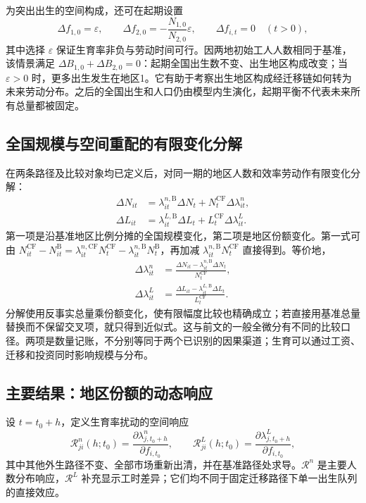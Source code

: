 \documentclass[UTF8,a4paper,zihao=-4,fontset=windows]{ctexart}
\numberwithin{equation}{section}
\begin{document}
为突出出生的空间构成，还可在起期设置
\begin{equation}
 \Delta f_{1,0}=\varepsilon,\qquad
 \Delta f_{2,0}=-\frac{N_{1,0}}{N_{2,0}}\varepsilon,
 \qquad \Delta f_{i,t}=0\quad(t>0),
 \label{eq:birth-neutral-two-region-scenario}
\end{equation}
其中选择 $\varepsilon$ 保证生育率非负与劳动时间可行。因两地初始工人人数相同于基准，该情景满足 $\Delta B_{1,0}+\Delta B_{2,0}=0$：起期全国出生数不变、出生地区构成改变；当 $\varepsilon>0$ 时，更多出生发生在地区1。它有助于考察出生地区构成经迁移链如何转为未来劳动分布。之后的全国出生和人口仍由模型内生演化，起期平衡不代表未来所有总量都被固定。

\subsection{全国规模与空间重配的有限变化分解}
在两条路径及比较对象均已定义后，对同一期的地区人数和效率劳动作有限变化分解：
\begin{align}
 \Delta N_{it}&=\lambda^{n,\mathrm B}_{it}\Delta N_t
 +N_t^{\mathrm{CF}}\Delta\lambda^n_{it},\\
 \Delta L_{it}&=\lambda^{L,\mathrm B}_{it}\Delta L_t
 +L_t^{\mathrm{CF}}\Delta\lambda^L_{it}.
 \label{eq:scale-spatial-decomposition}
\end{align}
第一项是沿基准地区比例分摊的全国规模变化，第二项是地区份额变化。第一式可由 $N^{\mathrm{CF}}_{it}-N^{\mathrm B}_{it}=\lambda^{n,\mathrm{CF}}_{it}N^{\mathrm{CF}}_t-\lambda^{n,\mathrm B}_{it}N^{\mathrm B}_t$，再加减 $\lambda^{n,\mathrm B}_{it}N^{\mathrm{CF}}_t$ 直接得到。等价地，
\begin{align}
 \Delta\lambda^n_{it}&=\frac{\Delta N_{it}-\lambda^{n,\mathrm B}_{it}\Delta N_t}{N_t^{\mathrm{CF}}},\\
 \Delta\lambda^L_{it}&=\frac{\Delta L_{it}-\lambda^{L,\mathrm B}_{it}\Delta L_t}{L_t^{\mathrm{CF}}}.
 \label{eq:finite-spatial-share-change}
\end{align}
分解使用反事实总量乘份额变化，使有限幅度比较也精确成立；若直接用基准总量替换而不保留交叉项，就只得到近似式。这与前文的一般全微分有不同的比较口径。两项是数量记账，不分别等同于两个已识别的因果渠道；生育可以通过工资、迁移和投资同时影响规模与分布。

\subsection{主要结果：地区份额的动态响应}
设 $t=t_0+h$，定义生育率扰动的空间响应
\begin{equation}
 \mathcal R^n_{ji}(h;t_0)=\frac{\partial\lambda^n_{j,t_0+h}}{\partial f_{i,t_0}},\qquad
 \mathcal R^L_{ji}(h;t_0)=\frac{\partial\lambda^L_{j,t_0+h}}{\partial f_{i,t_0}},
 \label{eq:two-region-spatial-response}
\end{equation}
其中其他外生路径不变、全部市场重新出清，并在基准路径处求导。$\mathcal R^n$ 是主要人数分布响应，$\mathcal R^L$ 补充显示工时差异；它们均不同于固定迁移路径下单一出生队列的直接效应。
\end{document}
